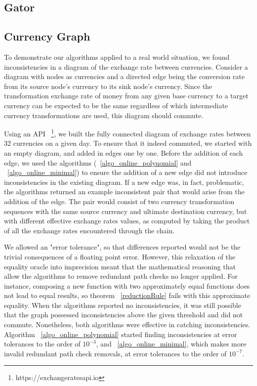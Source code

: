 \documentclass[sigplan,review,anonymous]{acmart}
\begin{document}
{\subsection{Gator}
\label{sec:gator}


\subsection{Currency Graph}
\label{sec:currency}

To demonstrate our algorithms applied to a real world situation, 
we found inconsistencies in a diagram of the exchange rate between currencies.
Consider a diagram with nodes as currencies and a directed edge being the
conversion rate from its source node's currency to its sink node's currency.
Since the transformation exchange rate of money from any given base currency to a target currency
can be expected to be the same regardless of which intermediate currency transformations
are used, this diagram should commute.

Using an API ~\footnote{https://exchangeratesapi.io}, we built the fully connected diagram of exchange rates between 32 currencies on a given day.
To ensure that it indeed commuted, we started with an empty diagram, and added in edges one by one.
Before the addition of each edge, we used the algorithms (~\ref{algo_online_polynomial} and ~\ref{algo_online_minimal}) to ensure the addition of a new edge did not introduce inconsistencies in the existing diagram.
If a new edge was, in fact, problematic, the algorithms returned an example inconsistent
pair that would arise from the addition of the edge.
The pair would consist of two currency transformation sequences with the 
same source currency and ultimate destination currency, but with different effective 
exchange rates values, as computed by taking the product of all the exchange rates
encountered through the chain.

We allowed an "error tolerance", so that differences reported would not be the trivial consequences of a floating point error.
However, this relaxation of the equality oracle into imprecision meant that the mathematical reasoning that allow the algorithms to remove redundant path checks no longer applied.
For instance, composing a new function with two approximately equal functions does not lead to equal results, so theorem ~\ref{reductionRule} fails with this approximate equality.
When the algorithms reported no inconsistencies, it was still possible that the graph possessed inconsistencies above the given threshold and did not commute.
Nonetheless, both algorithms were effective in catching inconsistencies. Algorithm ~\ref{algo_online_polynomial} started finding inconsistencies at error tolerances to the order of $10^{-3}$, and ~\ref{algo_online_minimal}, which makes more invalid redundant path check removals, at error tolerances to the order of $10^{-7}$.

}
\end{document}
